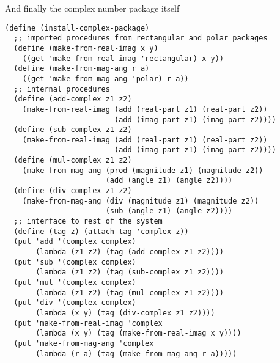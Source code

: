 \documentclass[a4paper,12pt]{article}
\begin{document}
And finally the complex number package itself
\begin{lstlisting}
(define (install-complex-package)
  ;; imported procedures from rectangular and polar packages
  (define (make-from-real-imag x y)
    ((get 'make-from-real-imag 'rectangular) x y))
  (define (make-from-mag-ang r a)
    ((get 'make-from-mag-ang 'polar) r a))
  ;; internal procedures
  (define (add-complex z1 z2)
    (make-from-real-imag (add (real-part z1) (real-part z2))
                         (add (imag-part z1) (imag-part z2))))
  (define (sub-complex z1 z2)
    (make-from-real-imag (add (real-part z1) (real-part z2))
                         (add (imag-part z1) (imag-part z2))))
  (define (mul-complex z1 z2)
    (make-from-mag-ang (prod (magnitude z1) (magnitude z2))
                       (add (angle z1) (angle z2))))
  (define (div-complex z1 z2)
    (make-from-mag-ang (div (magnitude z1) (magnitude z2))
                       (sub (angle z1) (angle z2))))
  ;; interface to rest of the system
  (define (tag z) (attach-tag 'complex z))
  (put 'add '(complex complex)
       (lambda (z1 z2) (tag (add-complex z1 z2))))
  (put 'sub '(complex complex)
       (lambda (z1 z2) (tag (sub-complex z1 z2))))
  (put 'mul '(complex complex)
       (lambda (z1 z2) (tag (mul-complex z1 z2))))
  (put 'div '(complex complex)
       (lambda (x y) (tag (div-complex z1 z2))))
  (put 'make-from-real-imag 'complex
       (lambda (x y) (tag (make-from-real-imag x y))))
  (put 'make-from-mag-ang 'complex
       (lambda (r a) (tag (make-from-mag-ang r a)))))
\end{lstlisting}
\end{document}
